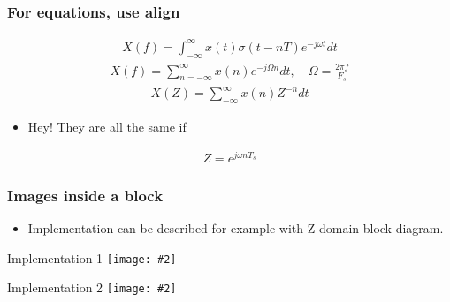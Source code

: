 \documentclass[logo=bluequo,normaltitle]{aaltoslides}
\newcommand{\putfig}[3][1.0]{
    \begin{block}{#3}
        \texttt{[image: \#2]}
    \end{block}
}
\begin{document}
\begin{frame}[t]
    \frametitle{For equations, use align}
    \begin{align*}
        X(f)=\int_{-\infty}^{\infty} x(t)\sigma\left(t-nT\right)e^{-j\omega t} dt
    \end{align*}
    \begin{align*}
        X(f)=\sum_{n=-\infty}^{\infty}x\left(n\right)e^{-j\Omega n} dt,\quad
        \Omega=\frac{2\pi f}{F_s}
    \end{align*}
    \begin{align*}
        X(Z)=\sum_{-\infty}^{\infty} x\left(n\right)Z^{-n}dt
    \end{align*}
        \begin{itemize}
            \item Hey! They are all the same if
        \end{itemize}
        \begin{align*}
            Z=e^{j\omega n T_s}
        \end{align*}
\end{frame}


\begin{frame}[t]
    \frametitle{Images inside a block}
\begin{itemize}
        \item  Implementation can be described for example with Z-domain block
            diagram. 
    \end{itemize}
    \begin{minipage}[t]{.45\linewidth}
        \putfig[0.78]{./Pics/SInc4_recursive.eps}{Implementation 1}
    \end{minipage}
    \hfill
    \begin{minipage}[t]{.45\linewidth}
        \putfig{./Pics/SInc4_FIR.eps}{Implementation 2}
    \end{minipage}
\end{frame}


    
\end{document}
